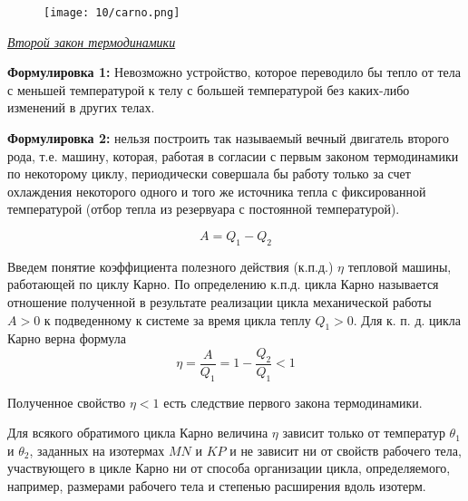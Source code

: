 \begin{figure}[H]
  \texttt{[image: 10/carno.png]}
\end{figure}


\begin{center}
  \textit{\underline{Второй закон термодинамики}}
\end{center}

\textbf{Формулировка 1:} Невозможно устройство, которое переводило бы тепло от тела с меньшей температурой к телу с большей температурой без каких-либо изменений в других телах.

\textbf{Формулировка 2:} нельзя построить так называемый вечный двигатель второго рода, т.е. машину,  которая,  работая в согласии с первым законом термодинамики по некоторому циклу,  периодически совершала бы работу только за счет охлаждения некоторого одного и того же источника тепла с фиксированной температурой (отбор тепла из резервуара с постоянной температурой).

$$ A = Q_1 - Q_2 $$

Введем понятие коэффициента полезного действия (к.п.д.) $\eta$ тепловой машины, работающей по циклу Карно. По определению к.п.д.  цикла Карно называется отношение полученной в результате реализации цикла механической работы $A > 0$ к подведенному к системе за время цикла теплу $Q_1 > 0$.  Для к. п. д. цикла Карно верна формула
$$ \eta = \frac{A}{Q_1} = 1 - \frac{Q_2}{Q_1} < 1 $$

Полученное свойство $\eta < 1$ есть следствие первого закона термодинамики.

\begin{state}
  Для всякого обратимого цикла Карно величина $\eta$ зависит только от температур $\theta_1$ и $\theta_2$,  заданных на изотермах $MN$ и $KP$ и не зависит ни от свойств рабочего тела, участвующего в цикле Карно ни от способа организации цикла, определяемого, например, размерами рабочего тела и степенью расширения вдоль изотерм.
\end{state}

